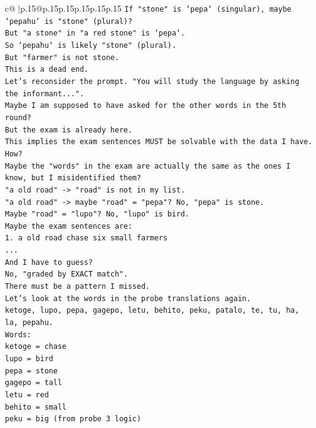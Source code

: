 \documentclass{article}
\begin{document}
{\begin{supertabular}{c@{$\;$}|p{.15\linewidth}@{}p{.15\linewidth}p{.15\linewidth}p{.15\linewidth}p{.15\linewidth}p{.15\linewidth}}
{{{\texttt{If "stone" is `pepa` (singular), maybe `pepahu` is "stone" (plural)?} \\
\texttt{But "a stone" in "a red stone" is `pepa`.} \\
\texttt{So `pepahu` is likely "stone" (plural).} \\
\texttt{But "farmer" is not stone.} \\
\texttt{This is a dead end.} \\
\texttt{Let's reconsider the prompt. "You will study the language by asking the informant...".} \\
\texttt{Maybe I am supposed to have asked for the other words in the 5th round?} \\
\texttt{But the exam is already here.} \\
\texttt{This implies the exam sentences MUST be solvable with the data I have.} \\
\texttt{How?} \\
\texttt{Maybe the "words" in the exam are actually the same as the ones I know, but I misidentified them?} \\
\texttt{"a old road" {-}> "road" is not in my list.} \\
\texttt{"a old road" {-}> maybe "road" = "pepa"? No, "pepa" is stone.} \\
\texttt{Maybe "road" = "lupo"? No, "lupo" is bird.} \\
\texttt{Maybe the exam sentences are:} \\
\texttt{1. a old road chase six small farmers} \\
\texttt{...} \\
\texttt{And I have to guess?} \\
\texttt{No, "graded by EXACT match".} \\
\texttt{There must be a pattern I missed.} \\
\texttt{Let's look at the words in the probe translations again.} \\
\texttt{ketoge, lupo, pepa, gagepo, letu, behito, peku, patalo, te, tu, ha, la, pepahu.} \\
\texttt{Words:} \\
\texttt{ketoge = chase} \\
\texttt{lupo = bird} \\
\texttt{pepa = stone} \\
\texttt{gagepo = tall} \\
\texttt{letu = red} \\
\texttt{behito = small} \\
\texttt{peku = big (from probe 3 logic)} \\
}}}
\end{supertabular}}
\end{document}
